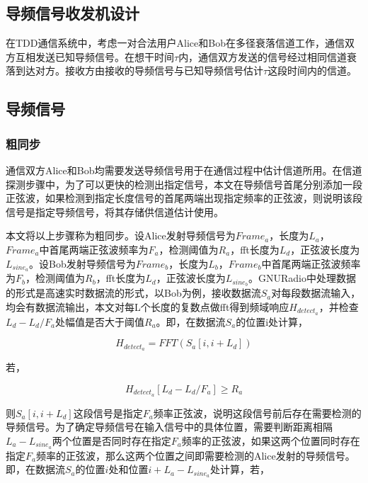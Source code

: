 \documentclass[master]{seuthesis} %
\begin{document}
\begin{Main}
\chapter{导频信号收发机设计}

在TDD通信系统中，考虑一对合法用户Alice和Bob在多径衰落信道工作，通信双方互相发送已知导频信号。在想干时间$\tau$内，通信双方发送的信号经过相同信道衰落到达对方。接收方由接收的导频信号与已知导频信号估计$\tau$这段时间内的信道。


\section{导频信号}

\subsection{粗同步}
通信双方Alice和Bob均需要发送导频信号用于在通信过程中估计信道所用。在信道探测步骤中，为了可以更快的检测出指定信号，本文在导频信号首尾分别添加一段正弦波，如果检测到指定长度信号的首尾两端出现指定频率的正弦波，则说明该段信号是指定导频信号，将其存储供信道估计使用。

本文将以上步骤称为粗同步。设Alice发射导频信号为$Frame_a$，长度为$L_a$，$Frame_a$中首尾两端正弦波频率为$F_a$，检测阈值为$R_a$，fft长度为$L_d$，正弦波长度为$L_{sine_a}$。设Bob发射导频信号为$Frame_b$，长度为$L_b$，$Frame_b$中首尾两端正弦波频率为$F_b$，检测阈值为$R_b$，fft长度为$L_d$，正弦波长度为$L_{sine_b}$。GNURadio中处理数据的形式是高速实时数据流的形式，以Bob为例，接收数据流$S_a$对每段数据流输入，均会有数据流输出，本文对每L个长度的复数点做fft得到频域响应$H_{detect_a}$，并检查$ L_d - L_d / F_a $处幅值是否大于阈值$R_a$。即，在数据流$S_a$的位置i处计算，

\begin{equation}
    H_{detect_a} = FFT(S_a[i, i+L_d])
\end{equation}

若，

\begin{equation}
    H_{detect_a}[L_d - L_d / F_a] \geq R_a 
\end{equation}

则$S_a[i, i+L_d]$这段信号是指定$F_a$频率正弦波，说明这段信号前后存在需要检测的导频信号。为了确定导频信号在输入信号中的具体位置，需要判断距离相隔$L_a - L_{sine_a}$两个位置是否同时存在指定$F_a$频率的正弦波，如果这两个位置同时存在指定$F_a$频率的正弦波，那么这两个位置之间即需要检测的Alice发射的导频信号。即，在数据流$S_a$的位置$i$处和位置$i+L_a-L_{sine_a}$处计算，若，


\end{Main}
\end{document}
